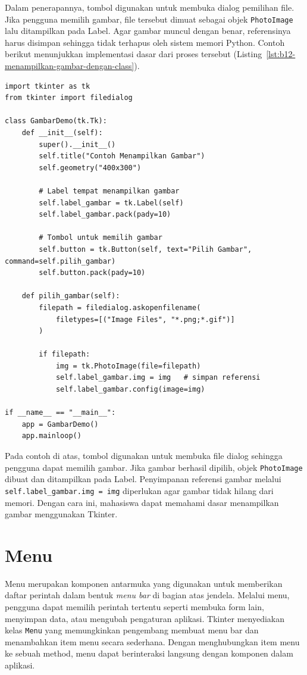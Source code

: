 Dalam penerapannya, tombol digunakan untuk membuka dialog pemilihan file. Jika pengguna memilih gambar, file tersebut dimuat sebagai objek \texttt{PhotoImage} lalu ditampilkan pada Label. Agar gambar muncul dengan benar, referensinya harus disimpan sehingga tidak terhapus oleh sistem memori Python. Contoh berikut menunjukkan implementasi dasar dari proses tersebut (Listing~\ref{lst:b12-menampilkan-gambar-dengan-class}).

\begin{lstlisting}[style=PythonStyle, caption={Contoh Menampilkan Gambar dengan Class}, label={lst:b12-menampilkan-gambar-dengan-class}]
import tkinter as tk
from tkinter import filedialog

class GambarDemo(tk.Tk):
    def __init__(self):
        super().__init__()
        self.title("Contoh Menampilkan Gambar")
        self.geometry("400x300")

        # Label tempat menampilkan gambar
        self.label_gambar = tk.Label(self)
        self.label_gambar.pack(pady=10)

        # Tombol untuk memilih gambar
        self.button = tk.Button(self, text="Pilih Gambar", command=self.pilih_gambar)
        self.button.pack(pady=10)

    def pilih_gambar(self):
        filepath = filedialog.askopenfilename(
            filetypes=[("Image Files", "*.png;*.gif")]
        )

        if filepath:
            img = tk.PhotoImage(file=filepath)
            self.label_gambar.img = img   # simpan referensi
            self.label_gambar.config(image=img)

if __name__ == "__main__":
    app = GambarDemo()
    app.mainloop()
\end{lstlisting}

Pada contoh di atas, tombol digunakan untuk membuka file dialog sehingga pengguna dapat memilih gambar. Jika gambar berhasil dipilih, objek \texttt{PhotoImage} dibuat dan ditampilkan pada Label. Penyimpanan referensi gambar melalui \texttt{self.label\_gambar.img = img} diperlukan agar gambar tidak hilang dari memori. Dengan cara ini, mahasiswa dapat memahami dasar menampilkan gambar menggunakan Tkinter.

\section{Menu}

Menu merupakan komponen antarmuka yang digunakan untuk memberikan daftar perintah dalam bentuk \textit{menu bar} di bagian atas jendela. Melalui menu, pengguna dapat memilih perintah tertentu seperti membuka form lain, menyimpan data, atau mengubah pengaturan aplikasi. Tkinter menyediakan kelas \texttt{Menu} yang memungkinkan pengembang membuat menu bar dan menambahkan item menu secara sederhana. Dengan menghubungkan item menu ke sebuah method, menu dapat berinteraksi langsung dengan komponen dalam aplikasi.

